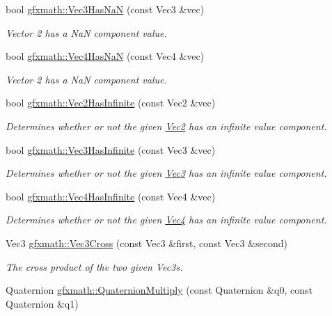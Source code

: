 \begin{DoxyCompactItemize}
bool \hyperlink{group___s_i_s_d_vec_math_ga5d19e3d1ee15741a65ede16f20e919a4}{gfxmath\+::\+Vec3\+Has\+Na\+N} (const Vec3 \&vec)
\begin{DoxyCompactList}\small\item\em Vector 2 has a Na\+N component value. \end{DoxyCompactList}\item 
bool \hyperlink{group___s_i_s_d_vec_math_gab82fdfebe73934664b56e9ba1174f37f}{gfxmath\+::\+Vec4\+Has\+Na\+N} (const Vec4 \&vec)
\begin{DoxyCompactList}\small\item\em Vector 2 has a Na\+N component value. \end{DoxyCompactList}\item 
bool \hyperlink{group___s_i_s_d_vec_math_ga6eb96a6532361189c7cacdbd9ae95c90}{gfxmath\+::\+Vec2\+Has\+Infinite} (const Vec2 \&vec)
\begin{DoxyCompactList}\small\item\em Determines whether or not the given \hyperlink{classgfxmath_1_1_vec2}{Vec2} has an infinite value component. \end{DoxyCompactList}\item 
bool \hyperlink{group___s_i_s_d_vec_math_gae5205e805b23de865db9a40e5936f82a}{gfxmath\+::\+Vec3\+Has\+Infinite} (const Vec3 \&vec)
\begin{DoxyCompactList}\small\item\em Determines whether or not the given \hyperlink{classgfxmath_1_1_vec3}{Vec3} has an infinite value component. \end{DoxyCompactList}\item 
bool \hyperlink{group___s_i_s_d_vec_math_ga29cd467d514b701c3a796cb75234be0b}{gfxmath\+::\+Vec4\+Has\+Infinite} (const Vec4 \&vec)
\begin{DoxyCompactList}\small\item\em Determines whether or not the given \hyperlink{classgfxmath_1_1_vec4}{Vec4} has an infinite value component. \end{DoxyCompactList}\item 
Vec3 \hyperlink{group___s_i_s_d_vec_math_ga455b2ef17c947a780f2b2b9e4b6cccc8}{gfxmath\+::\+Vec3\+Cross} (const Vec3 \&first, const Vec3 \&second)
\begin{DoxyCompactList}\small\item\em The cross product of the two given Vec3s. \end{DoxyCompactList}\item 
Quaternion \hyperlink{group___s_i_s_d_vec_math_ga01d5534572884ea932229ccb1aa17ac1}{gfxmath\+::\+Quaternion\+Multiply} (const Quaternion \&q0, const Quaternion \&q1)

\end{DoxyCompactItemize}
